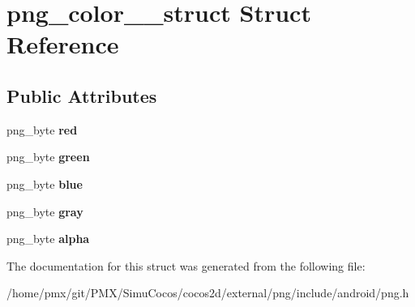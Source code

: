 \hypertarget{structpng__color__8__struct}{}\section{png\+\_\+color\+\_\+\_\+struct Struct Reference}
\label{structpng__color__8__struct}
\subsection*{Public Attributes}
\begin{DoxyCompactItemize}
\item 
\mbox{\label{structpng__color__8__struct_a5cd91bb4b3429256b84e6f28c72778b8}} 
png\+\_\+byte {\bfseries red}
\item 
\mbox{\label{structpng__color__8__struct_a40d053224177df35c037525b39563b05}} 
png\+\_\+byte {\bfseries green}
\item 
\mbox{\label{structpng__color__8__struct_a58225d3b6426185d5a40d3c9935db96a}} 
png\+\_\+byte {\bfseries blue}
\item 
\mbox{\label{structpng__color__8__struct_a574edc173d956cca144927262e88653e}} 
png\+\_\+byte {\bfseries gray}
\item 
\mbox{\label{structpng__color__8__struct_af1c7203aefe12bd35dc9a4cdd58e7a4b}} 
png\+\_\+byte {\bfseries alpha}
\end{DoxyCompactItemize}


The documentation for this struct was generated from the following file\+:\begin{DoxyCompactItemize}
\item 
/home/pmx/git/\+P\+M\+X/\+Simu\+Cocos/cocos2d/external/png/include/android/png.\+h\end{DoxyCompactItemize}
